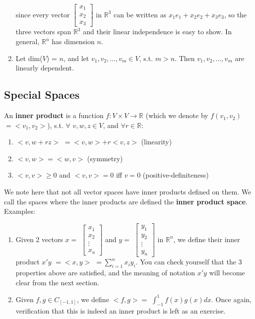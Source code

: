\documentclass[12pt,oneside]{article}
\begin{document}
\begin{enumerate}
  since every vector $\left[ \begin{array} {c} x_{1} \\ x_{2} \\ x_{3}
  \end{array} \right]$ in ${\mathbb{R}}^{3}$ can be written as $x_{1}
  e_{1} + x_{2} e_{2} + x_{3} e_{3}$, so the three vectors span
  ${\mathbb{R}}^{3}$ and their linear independence is easy to show. In
  general, ${\mathbb{R}}^{n}$ has dimension $n$.
\item Let dim($V$) = $n$, and let $v_{1}, v_{2}, \ldots, v_{m} \in V$,
  s.t. $m > n$. Then $v_{1}, v_{2}, \ldots, v_{m}$ are linearly
  dependent.
\end{enumerate}

\subsection{Special Spaces}
An \textbf{inner product} is a function $f: V \times V \rightarrow \mathbb{R}$
(which we denote by $f(v_{1}, v_{2})$ $= <v_{1}, v_{2}>$),
s.t. $\forall$ $v, w, z \in V$, and $\forall r \in \mathbb{R}$:
\begin{enumerate}
\item $<v, w + r z>$ $= <v, w> + r <v, z>$ (linearity)
\item $<v, w> = <w, v>$ (symmetry)
\item $<v, v> \geq 0$ and $<v, v> = 0$ iff $v = 0$ (positive-definiteness)
\end{enumerate}
We note here that not all vector spaces have inner products defined on
them.
We call the spaces where the inner products are defined the \textbf{inner product space}.\\

\noindent Examples:
\begin{enumerate}
\item Given 2 vectors $x =$ $\left[ \begin{array} {c} x_{1} \\ x_{2} \\
      \vdots \\ x_{n} \end{array} \right]$ and $y =$ $\left[
      \begin{array} {c} y_{1} \\ y_{2} \\ \vdots \\ y_{n} \end{array}
      \right]$ in ${\mathbb{R}}^{n}$, we define their inner product
      $x'y$ $= <x, y>$ $= \displaystyle\sum_{i=1}^{n} {x_{i}
      y_{i}}$. You can check yourself that the 3 properties above are
      satisfied, and the meaning of notation $x' y$ will become clear
      from the next section.
\item Given $f, g \in C_{[-1, 1]}$, we define $<f, g> =$ $\int_{-1}^{1}
  {f(x) g(x) dx}$. Once again, verification that this is indeed an
  inner product is left as an exercise.
\end{enumerate}
\end{document}
